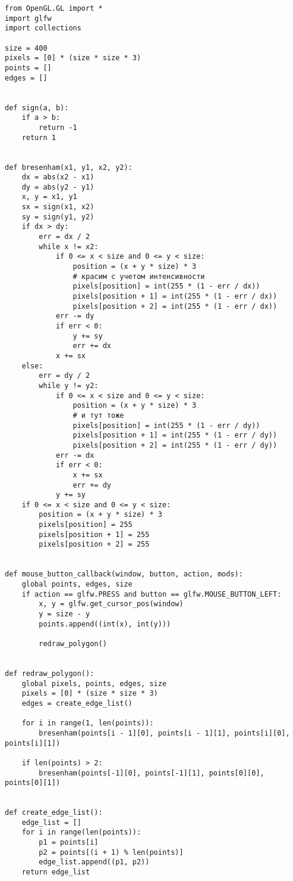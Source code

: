 \documentclass[a4paper, 14pt]{extarticle}
\begin{document}
\begin{lstlisting}
from OpenGL.GL import *
import glfw
import collections

size = 400
pixels = [0] * (size * size * 3)
points = []
edges = []


def sign(a, b):
    if a > b:
        return -1
    return 1


def bresenham(x1, y1, x2, y2):
    dx = abs(x2 - x1)
    dy = abs(y2 - y1)
    x, y = x1, y1
    sx = sign(x1, x2)
    sy = sign(y1, y2)
    if dx > dy:
        err = dx / 2
        while x != x2:
            if 0 <= x < size and 0 <= y < size:
                position = (x + y * size) * 3
                # красим с учетом интенсивности
                pixels[position] = int(255 * (1 - err / dx))
                pixels[position + 1] = int(255 * (1 - err / dx))
                pixels[position + 2] = int(255 * (1 - err / dx))
            err -= dy
            if err < 0:
                y += sy
                err += dx
            x += sx
    else:
        err = dy / 2
        while y != y2:
            if 0 <= x < size and 0 <= y < size:
                position = (x + y * size) * 3
                # и тут тоже
                pixels[position] = int(255 * (1 - err / dy))
                pixels[position + 1] = int(255 * (1 - err / dy))
                pixels[position + 2] = int(255 * (1 - err / dy))
            err -= dx
            if err < 0:
                x += sx
                err += dy
            y += sy
    if 0 <= x < size and 0 <= y < size:
        position = (x + y * size) * 3
        pixels[position] = 255
        pixels[position + 1] = 255
        pixels[position + 2] = 255


def mouse_button_callback(window, button, action, mods):
    global points, edges, size
    if action == glfw.PRESS and button == glfw.MOUSE_BUTTON_LEFT:
        x, y = glfw.get_cursor_pos(window)
        y = size - y
        points.append((int(x), int(y)))

        redraw_polygon()


def redraw_polygon():
    global pixels, points, edges, size
    pixels = [0] * (size * size * 3)
    edges = create_edge_list()

    for i in range(1, len(points)):
        bresenham(points[i - 1][0], points[i - 1][1], points[i][0], points[i][1])

    if len(points) > 2:
        bresenham(points[-1][0], points[-1][1], points[0][0], points[0][1])


def create_edge_list():
    edge_list = []
    for i in range(len(points)):
        p1 = points[i]
        p2 = points[(i + 1) % len(points)]
        edge_list.append((p1, p2))
    return edge_list



\end{lstlisting}
\end{document}

